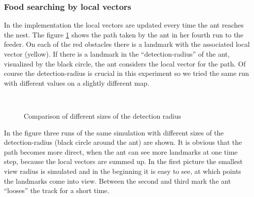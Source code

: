 \documentclass[11pt]{article}
\begin{document}
\subsubsection{Food searching by local vectors}
In the implementation the local vectors are updated every time the ant reaches the nest. The figure \ref{fig8} shows the path taken by the ant in her fourth run to the feeder. On each of the red obstacles there is a landmark with the associated local vector (yellow). If there is a landmark in the “detection-radius” of the ant, visualized by the black circle, the ant considers the local vector for the path. Of course the detection-radius is crucial in this experiment so we tried the same run with different values on a slightly different map.

\begin{figure}[h!]
   \centering
   \hspace{1cm}
   \\
   \caption[Comparing growing detection radius]{Comparison of different sizes of the detection radius}
\label{fig8}
\end{figure}

In the figure three runs of the same simulation with different sizes of the detection-radius (black circle around the ant) are shown. It is obvious that the path becomes more direct, when the ant can see more landmarks at one time step, because the local vectors are summed up. In the first picture the smallest view radius is simulated and in the beginning it is easy to see, at which points the landmarks come into view. Between the second and third mark the ant “looses” the track for a short time.
\end{document}
